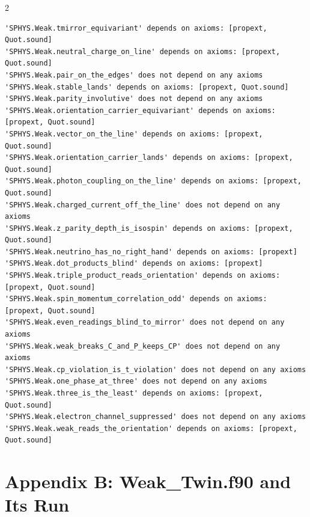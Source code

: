\documentclass[10pt]{article}
\begin{document}
\begin{multicols}{2}
\begin{Verbatim}[fontsize=\fontsize{6.2}{7.2}\selectfont,breaklines,breakanywhere,breaksymbolleft={}]
'SPHYS.Weak.tmirror_equivariant' depends on axioms: [propext, Quot.sound]
'SPHYS.Weak.neutral_charge_on_line' depends on axioms: [propext, Quot.sound]
'SPHYS.Weak.pair_on_the_edges' does not depend on any axioms
'SPHYS.Weak.stable_lands' depends on axioms: [propext, Quot.sound]
'SPHYS.Weak.parity_involutive' does not depend on any axioms
'SPHYS.Weak.orientation_carrier_equivariant' depends on axioms: [propext, Quot.sound]
'SPHYS.Weak.vector_on_the_line' depends on axioms: [propext, Quot.sound]
'SPHYS.Weak.orientation_carrier_lands' depends on axioms: [propext, Quot.sound]
'SPHYS.Weak.photon_coupling_on_the_line' depends on axioms: [propext, Quot.sound]
'SPHYS.Weak.charged_current_off_the_line' does not depend on any axioms
'SPHYS.Weak.z_parity_depth_is_isospin' depends on axioms: [propext, Quot.sound]
'SPHYS.Weak.neutrino_has_no_right_hand' depends on axioms: [propext]
'SPHYS.Weak.dot_products_blind' depends on axioms: [propext]
'SPHYS.Weak.triple_product_reads_orientation' depends on axioms: [propext, Quot.sound]
'SPHYS.Weak.spin_momentum_correlation_odd' depends on axioms: [propext, Quot.sound]
'SPHYS.Weak.even_readings_blind_to_mirror' does not depend on any axioms
'SPHYS.Weak.weak_breaks_C_and_P_keeps_CP' does not depend on any axioms
'SPHYS.Weak.cp_violation_is_t_violation' does not depend on any axioms
'SPHYS.Weak.one_phase_at_three' does not depend on any axioms
'SPHYS.Weak.three_is_the_least' depends on axioms: [propext, Quot.sound]
'SPHYS.Weak.electron_channel_suppressed' does not depend on any axioms
'SPHYS.Weak.weak_reads_the_orientation' depends on axioms: [propext, Quot.sound]
\end{Verbatim}
\end{multicols}

\hypertarget{appendix-b-weak_twin.f90-and-its-run}{%
\section{Appendix B: Weak\_Twin.f90 and Its
Run}\label{appendix-b-weak_twin.f90-and-its-run}}
\end{document}
